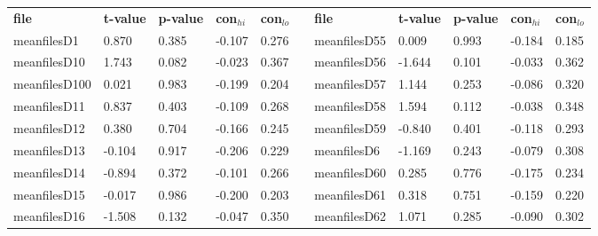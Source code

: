 \begin{table}[h!]
\small
\begin{tabular}{lllllllllll}
\textbf{file} & \textbf{t-value} & \textbf{p-value} & \textbf{con$_{hi}$} & \textbf{con$_{lo}$} & \textbf{} & \textbf{file} & \textbf{t-value} & \textbf{p-value} & \textbf{con$_{hi}$} & \textbf{con$_{lo}$} \\ \cline{1-5} \cline{7-11} 
meanfilesD1   & 0.870            & 0.385            & -0.107              & 0.276               &           & meanfilesD55  & 0.009            & 0.993            & -0.184              & 0.185               \\
meanfilesD10  & 1.743            & 0.082            & -0.023              & 0.367               &           & meanfilesD56  & -1.644           & 0.101            & -0.033              & 0.362               \\
meanfilesD100 & 0.021            & 0.983            & -0.199              & 0.204               &           & meanfilesD57  & 1.144            & 0.253            & -0.086              & 0.320               \\
meanfilesD11  & 0.837            & 0.403            & -0.109              & 0.268               &           & meanfilesD58  & 1.594            & 0.112            & -0.038              & 0.348               \\
meanfilesD12  & 0.380            & 0.704            & -0.166              & 0.245               &           & meanfilesD59  & -0.840           & 0.401            & -0.118              & 0.293               \\
meanfilesD13  & -0.104           & 0.917            & -0.206              & 0.229               &           & meanfilesD6   & -1.169           & 0.243            & -0.079              & 0.308               \\
meanfilesD14  & -0.894           & 0.372            & -0.101              & 0.266               &           & meanfilesD60  & 0.285            & 0.776            & -0.175              & 0.234               \\
meanfilesD15  & -0.017           & 0.986            & -0.200              & 0.203               &           & meanfilesD61  & 0.318            & 0.751            & -0.159              & 0.220               \\
meanfilesD16  & -1.508           & 0.132            & -0.047              & 0.350               &           & meanfilesD62  & 1.071            & 0.285            & -0.090              & 0.302               \\

\end{tabular}
\end{table}
